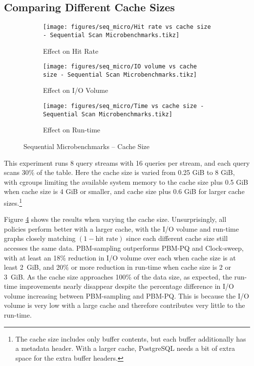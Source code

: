 \subsection{Comparing Different Cache Sizes}


\begin{figure}
\centering
    \begin{subfigure}{0.45\textwidth}
    \centering
    \texttt{[image: figures/seq\_micro/Hit rate vs cache size - Sequential Scan Microbenchmarks.tikz]}
    \caption{Effect on Hit Rate}
    \label{fig:seq_micro_shmem_hitrate}
\end{subfigure}\hspace{0.05\textwidth}%
\begin{subfigure}{0.45\textwidth}
    \centering
    \texttt{[image: figures/seq\_micro/IO volume vs cache size - Sequential Scan Microbenchmarks.tikz]}
    \caption{Effect on I/O Volume}
    \label{fig:seq_micro_shmem_iovol}
\end{subfigure}

\vspace{20pt}
\begin{subfigure}{0.45\textwidth}
    \centering
    \texttt{[image: figures/seq\_micro/Time vs cache size - Sequential Scan Microbenchmarks.tikz]}
    \caption{Effect on Run-time}
    \label{fig:seq_micro_shmem_time}
\end{subfigure}

\caption{Sequential Microbenchmarks -- Cache Size}
\label{fig:seq_micro_shmem}
\end{figure}


This experiment runs 8 query streams with 16 queries per stream, and each query scans 30\% of the table. Here the cache size is varied from 0.25 GiB  to 8 GiB, with cgroups limiting the available system memory to the cache size plus 0.5 GiB when cache size is 4 GiB or smaller, and cache size plus 0.6 GiB for larger cache sizes.\footnote{The cache size includes only buffer contents, but each buffer additionally has a metadata header. With a larger cache, PostgreSQL needs a bit of extra space for the extra buffer headers.}

Figure \ref{fig:seq_micro_shmem} shows the results when varying the cache size.
Unsurprisingly, all policies perform better with a larger cache, with the I/O volume and run-time graphs closely matching $(1-\text{hit rate})$ since each different cache size still accesses the same data. PBM-sampling outperforms PBM-PQ and Clock-sweep, with at least an 18\% reduction in I/O volume over each when cache size is at least 2~GiB, and 20\% or more reduction in run-time when cache size is 2 or 3~GiB. As the cache size approaches 100\% of the data size, as expected, the run-time improvements nearly disappear despite the percentage difference in I/O volume increasing between PBM-sampling and PBM-PQ. This is because the I/O volume is very low with a large cache and therefore contributes very little to the run-time. 


